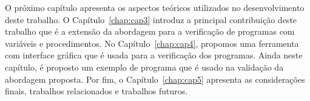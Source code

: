 %
%
%
%


O próximo capítulo apresenta os aspectos teóricos utilizados no desenvolvimento deste trabalho. O Capítulo~\ref{chap:cap3} introduz a principal contribuição deste trabalho que é a extensão da abordagem para a verificação de programas com variáveis e procedimentos. No Capítulo~\ref{chap:cap4}, propomos uma ferramenta com interface gráfica que é usada para a verificação dos programas. Ainda neste capítulo, é proposto um exemplo de programa que é usado na validação da abordagem proposta. Por fim, o Capítulo~\ref{chap:cap5} apresenta as considerações finais, trabalhos relacionados e trabalhos futuros.